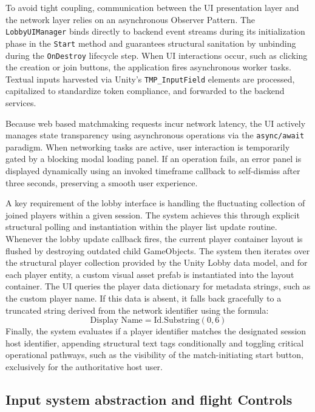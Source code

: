 \documentclass[12pt]{report}
\begin{document}
To avoid tight coupling, communication between the UI presentation layer and the network layer relies on an asynchronous Observer Pattern. The \texttt{LobbyUIManager} binds directly to backend event streams during its initialization phase in the \texttt{Start} method and guarantees structural sanitation by unbinding during the \texttt{OnDestroy} lifecycle step. When UI interactions occur, such as clicking the creation or join buttons, the application fires asynchronous worker tasks. Textual inputs harvested via Unity's \texttt{TMP\_InputField} elements are processed, capitalized to standardize token compliance, and forwarded to the backend services. 

Because web based matchmaking requests incur network latency, the UI actively manages state transparency using asynchronous operations via the \texttt{async/await} paradigm. When networking tasks are active, user interaction is temporarily gated by a blocking modal loading panel. If an operation fails, an error panel is displayed dynamically using an invoked timeframe callback to self-dismiss after three seconds, preserving a smooth user experience.

A key requirement of the lobby interface is handling the fluctuating collection of joined players within a given session. The system achieves this through explicit structural polling and instantiation within the player list update routine. Whenever the lobby update callback fires, the current player container layout is flushed by destroying outdated child GameObjects. The system then iterates over the structural player collection provided by the Unity Lobby data model, and for each player entity, a custom visual asset prefab is instantiated into the layout container. The UI queries the player data dictionary for metadata strings, such as the custom player name. If this data is absent, it falls back gracefully to a truncated string derived from the network identifier using the formula:
\begin{equation}
\text{Display Name} = \text{Id.Substring}(0, 6)
\end{equation}
Finally, the system evaluates if a player identifier matches the designated session host identifier, appending structural text tags conditionally and toggling critical operational pathways, such as the visibility of the match-initiating start button, exclusively for the authoritative host user.

\subsection{Input system abstraction and flight Controls}
\end{document}
